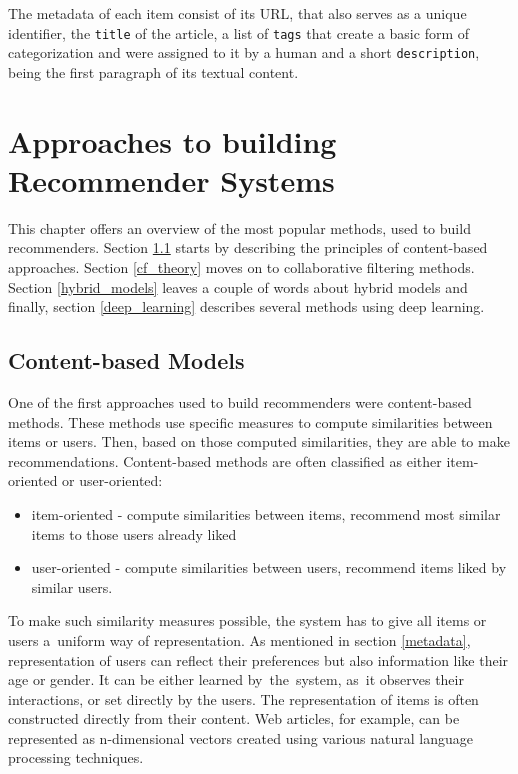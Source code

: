 The metadata of each item consist of its URL, that also serves as a unique identifier, the \texttt{title} of the article, a list of \texttt{tags} that create a basic form of categorization and were assigned to it by a human and a short \texttt{description}, being the first paragraph of its textual content.


\chapter{Approaches to building Recommender Systems} \label{approaches}
This chapter offers an overview of the most popular methods, used to build recommenders. Section \ref{content_based} starts by describing the principles of content-based approaches. Section \ref{cf_theory} moves on to collaborative filtering methods. Section \ref{hybrid_models} leaves a couple of words about hybrid models and finally, section \ref{deep_learning} describes several methods using deep learning.

\section{Content-based Models} \label{content_based}

One of the first approaches used to build recommenders were content-based methods. These methods use specific measures to compute similarities between items or users. Then, based on those computed similarities, they are able to make recommendations.
Content-based methods are often classified as either item-oriented or user-oriented:

\begin{itemize}
    \item item-oriented - compute similarities between items, recommend most similar items to those users already liked
    \item user-oriented - compute similarities between users, recommend items liked by similar users.
\end{itemize}
To make such similarity measures possible, the system has to give all items or users a~uniform way of representation. As mentioned in section \ref{metadata}, representation of users can reflect their preferences but also information like their age or gender. It can be either learned by~the~system, as~it observes their interactions, or set directly by the users. The representation of items is often constructed directly from their content. Web articles, for example, can be represented as n-dimensional vectors created using various natural language processing techniques.

